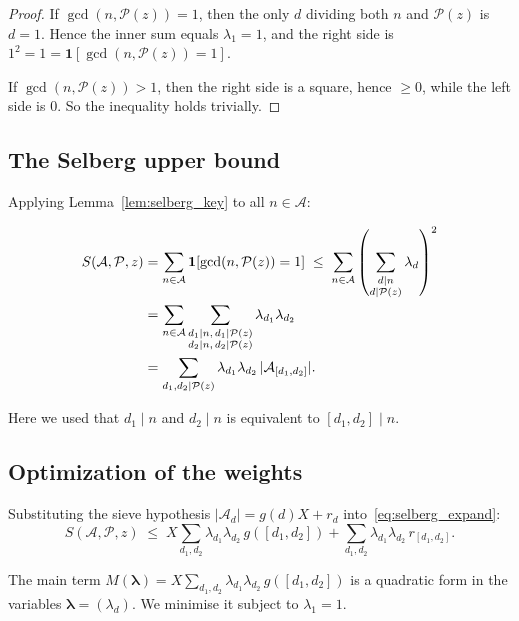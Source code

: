 \documentclass[12pt,a4paper]{amsart}
\theoremstyle{definition}
\begin{document}
\begin{proof}
  If $\gcd(n, \mathcal{P}(z)) = 1$, then the only $d$ dividing both $n$ and
  $\mathcal{P}(z)$ is $d = 1$.  Hence the inner sum equals $\lambda_1 = 1$,
  and the right side is $1^2 = 1 = \mathbf{1}[\gcd(n,\mathcal{P}(z))=1]$.

  If $\gcd(n, \mathcal{P}(z)) > 1$, then the right side is a square, hence
  $\geq 0$, while the left side is $0$.  So the inequality holds trivially.
\end{proof}

\subsection{The Selberg upper bound}

Applying Lemma~\ref{lem:selberg_key} to all $n \in \mathcal{A}$:

\begin{align}
  S(\mathcal{A}, \mathcal{P}, z)
  &= \sum_{n \in \mathcal{A}} \mathbf{1}[\gcd(n,\mathcal{P}(z))=1]
  \;\leq\; \sum_{n \in \mathcal{A}}
    \left(\sum_{\substack{d \mid n \\ d \mid \mathcal{P}(z)}} \lambda_d\right)^2 \notag \\
  &= \sum_{n \in \mathcal{A}}
     \sum_{\substack{d_1 \mid n,\, d_1 \mid \mathcal{P}(z)\\
                     d_2 \mid n,\, d_2 \mid \mathcal{P}(z)}}
     \lambda_{d_1} \lambda_{d_2} \notag \\
  &= \sum_{\substack{d_1, d_2 \mid \mathcal{P}(z)}}
     \lambda_{d_1} \lambda_{d_2}\, |\mathcal{A}_{[d_1,d_2]}|. \label{eq:selberg_expand}
\end{align}

Here we used that $d_1 \mid n$ and $d_2 \mid n$ is equivalent to $[d_1,d_2] \mid n$.

\subsection{Optimization of the weights}

Substituting the sieve hypothesis $|\mathcal{A}_d| = g(d)X + r_d$ into~\eqref{eq:selberg_expand}:
\begin{equation}\label{eq:selberg_split}
  S(\mathcal{A},\mathcal{P},z)
  \;\leq\; X \sum_{d_1,d_2} \lambda_{d_1}\lambda_{d_2}\, g([d_1,d_2])
             + \sum_{d_1,d_2} \lambda_{d_1}\lambda_{d_2}\, r_{[d_1,d_2]}.
\end{equation}

The main term $M(\boldsymbol{\lambda}) = X \sum_{d_1,d_2} \lambda_{d_1}\lambda_{d_2}\, g([d_1,d_2])$
is a quadratic form in the variables $\boldsymbol{\lambda} = (\lambda_d)$.
We minimise it subject to $\lambda_1 = 1$.
\end{document}
